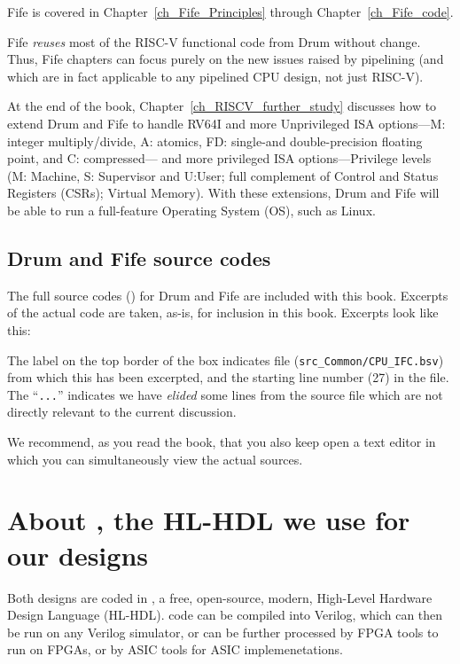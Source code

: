 Fife is covered in Chapter~\ref{ch_Fife_Principles} through
Chapter~\ref{ch_Fife_code}.

Fife \emph{reuses} most of the RISC-V functional code from Drum
without change.  Thus, Fife chapters can focus purely on the new
issues raised by pipelining (and which are in fact applicable to any
pipelined CPU design, not just RISC-V).

At the end of the book, Chapter~\ref{ch_RISCV_further_study} discusses
how to extend Drum and Fife to handle RV64I and more Unprivileged ISA
options---M: integer multiply/divide, A: atomics, FD: single-and
double-precision floating point, and C: compressed--- and more
privileged ISA options---Privilege levels (M: Machine, S: Supervisor
and U:User; full complement of Control and Status Registers (CSRs);
Virtual Memory).  With these extensions, Drum and Fife will be able to
run a full-feature Operating System (OS), such as Linux.


\subsection{Drum and Fife source codes}

The full source codes ({\BSV}) for Drum and Fife are included with this
book.  Excerpts of the actual code are taken, as-is, for inclusion in
this book.  Excerpts look like this:


The label on the top border of the box indicates file
(\verb|src_Common/CPU_IFC.bsv|) from which this has been excerpted,
and the starting line number (27) in the file.  The ``\verb|...|''
indicates we have \emph{elided} some lines from the source file which
are not directly relevant to the current discussion.

We recommend, as you read the book, that you also keep open a text
editor in which you can simultaneously view the actual sources.


\section{About {\BSV}, the HL-HDL we use for our designs}

Both designs are coded in {\BSV}, a free, open-source, modern, High-Level
Hardware Design Language (HL-HDL).  {\BSV} code can be compiled into
Verilog, which can then be run on any Verilog simulator, or can be
further processed by FPGA tools to run on FPGAs, or by ASIC tools for
ASIC implemenetations.

